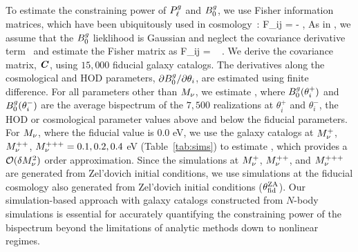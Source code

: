 To estimate the constraining power of $P^g_{\ell}$ and $B^g_0$, we use Fisher information
matrices, which have been ubiquitously used in
cosmology~\citep[\emph{e.g.}][]{jungman1996,tegmark1997,dodelson2003,heavens2009,verde2010}: 
\beq 
F_{ij} = - \bigg \langle {} \bigg \rangle,
\eeq
As in \cite{hahn2020}, we assume that the $B^g_0$ lieklihood is Gaussian and
neglect the covariance derivative term~\citep{carron2013} and estimate the
Fisher matrix as 
\beq \label{eq:fisher}
F_{ij} = ~ .
\eeq
We derive the covariance matrix, $\textbf{\textit{C}}$, using $15,000$ fiducial galaxy
catalogs. The derivatives along the cosmological and HOD
parameters, $\partial B^g_0/\partial \theta_i$, are estimated using finite
difference. For all parameters other than $M_\nu$, we estimate 
\beq 
{} \approx {}, 
\eeq
where $B^g_0(\theta_i^{+})$ and $B^g_0(\theta_i^{-})$ are the average bispectrum of the 
$7,500$ realizations at $\theta_i^{+}$ and $\theta_i^{-}$, the HOD or 
cosmological parameter values above and below the fiducial parameters.  
For $M_\nu$, where the fiducial value is 0.0 eV, we use the galaxy catalogs 
at $M_\nu^+$, $M_\nu^{++}$, $M_\nu^{+++}=0.1, 0.2, 0.4$ eV (Table~\ref{tab:sims}) 
to estimate 
\beq \label{eq:dbkdmnu} 
\frac{\partial \Bg}{\partial \smnu} \approx {}, 
\eeq
which provides a $\mathcal{O}(\delta M_\nu^2)$ order approximation. 
Since the simulations at $M_\nu^+$, $M_\nu^{++}$, and $M_\nu^{+++}$ are generated 
from Zel'dovich initial conditions, we use simulations at the fiducial cosmology 
also generated from Zel'dovich initial conditions ($\theta_{\rm fid}^{\rm ZA}$). 
Our simulation-based approach with galaxy catalogs constructed from
$N$-body simulations is essential for accurately quantifying the constraining power
of the bispectrum beyond the limitations of analytic methods down to nonlinear
regimes.
